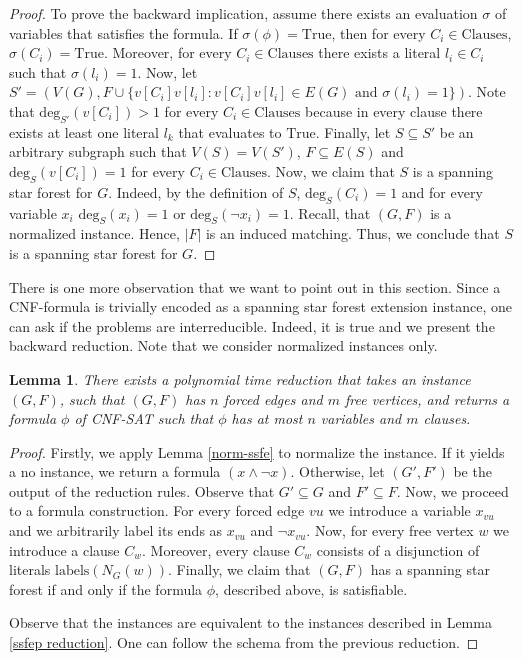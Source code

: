 \documentclass[en]{pracamgr}
\newtheorem{lemma}{Lemma}
\newcommand{\cnfsat}{{\sc CNF-SAT}}
\newcommand{\degree}[2]{\textrm{deg}_{#1}(#2)}
\begin{document}
\begin{proof}
	To prove the backward implication, assume there exists an evaluation $\sigma$ of variables that satisfies the formula. If $\sigma(\phi)=\textrm{True}$, then for every $C_i \in \textrm{Clauses}$, $\sigma(C_i)=\textrm{True}$. Moreover, for every $C_i \in \textrm{Clauses}$ there exists a literal $l_i \in C_i$ such that $\sigma(l_i)=1$. Now, let $S' = (V(G), F \cup \{v[C_i]v[l_i]: v[C_i]v[l_i] \in E(G) \text{ and } \sigma(l_i)=1\})$. Note that $\degree{S'}{v[C_i]}>1$ for every $C_i \in \textrm{Clauses}$ because in every clause there exists at least one literal $l_k$ that evaluates to $\textrm{True}$. Finally, let $S \subseteq S'$ be an arbitrary subgraph such that $V(S)=V(S')$, $F \subseteq E(S)$ and $\degree{S}{v[C_i]}=1$ for every $C_i \in \textrm{Clauses}$. Now, we claim that $S$ is a spanning star forest for $G$. Indeed, by the definition of $S$, $\degree{S}{C_i}=1$ and for every variable $x_i$ $\degree{S}{x_i}=1$ or $\degree{S}{\neg x_i}=1$. Recall, that $(G,F)$ is a normalized instance. Hence, $|F|$ is an induced matching. Thus, we conclude that $S$ is a spanning star forest for $G$.
\end{proof}

There is one more observation that we want to point out in this section. Since a CNF-formula is trivially encoded as a spanning star forest extension instance, one can ask if the problems are interreducible. Indeed, it is true and we present the backward reduction. Note that we consider normalized instances only.

\begin{lemma}\label{cnfsat reduction}
	There exists a polynomial time reduction that takes an instance $(G,F)$, such that $(G,F)$ has $n$ forced edges and $m$ free vertices, and returns a formula $\phi$ of \cnfsat{} such that $\phi$ has at most $n$ variables and $m$ clauses.
\end{lemma}

\begin{proof}
	Firstly, we apply Lemma \ref{norm-ssfe} to normalize the instance. If it yields a no instance, we return a formula $(x \land \neg x)$. Otherwise, let $(G',F')$ be the output of the reduction rules. Observe that $G' \subseteq G$ and $F' \subseteq F$. Now, we proceed to a formula construction. For every forced edge $vu$ we introduce a variable $x_{vu}$ and we arbitrarily label its ends as $x_{vu}$ and $\neg x_{vu}$. Now, for every free vertex $w$ we introduce a clause $C_w$. Moreover, every clause $C_w$ consists of a disjunction of literals $\textrm{labels}(N_G(w))$. Finally, we claim that $(G,F)$ has a spanning star forest if and only if the formula $\phi$, described above, is satisfiable.
	
	Observe that the instances are equivalent to the instances described in Lemma \ref{ssfep reduction}. One can follow the schema from the previous reduction.
\end{proof}
\end{document}
